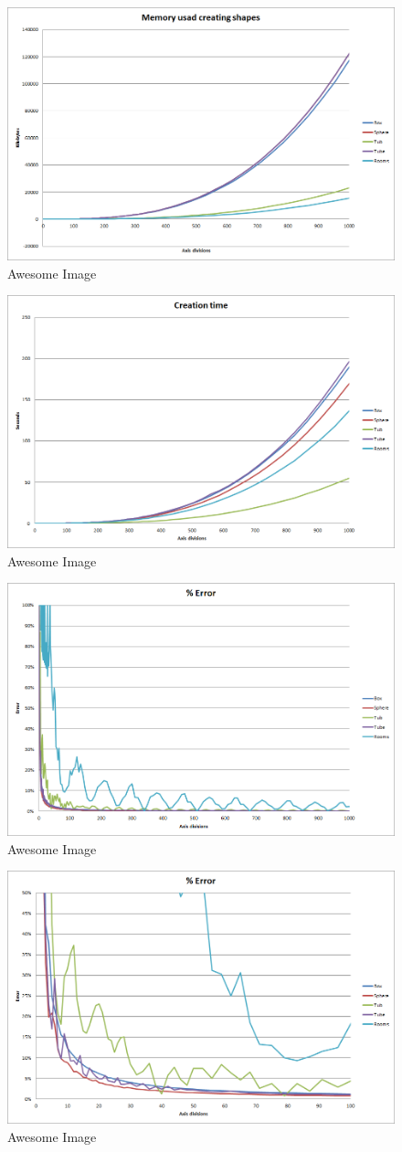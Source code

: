 \documentclass[11pt,twoside,a4paper]{report}
\begin{document}
\begin{figure}[h] \centering \includegraphics[width=0.45\linewidth]{images/chart_voxel_creation_memory}
    \caption{Awesome Image} \label{fig:awesome_image1} \end{figure}
\begin{figure}[h] \centering \includegraphics[width=0.45\linewidth]{images/chart_voxel_creation_time}
    \caption{Awesome Image} \label{fig:awesome_image1} \end{figure}
\begin{figure}[h] \centering \includegraphics[width=0.45\linewidth]{images/chart_voxel_error}
    \caption{Awesome Image} \label{fig:awesome_image1} \end{figure}
\begin{figure}[h] \centering \includegraphics[width=0.45\linewidth]{images/chart_voxel_error_zoomed}
    \caption{Awesome Image} \label{fig:awesome_image1} \end{figure}
\end{document}
